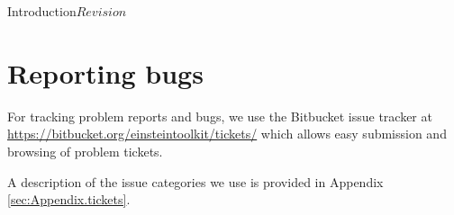 \begin{cactuspart}{Introduction}{}{$Revision$}

\chapter{Reporting bugs}
\label{sec:gehe}

For tracking problem reports and bugs, we use the Bitbucket issue tracker at
\url{https://bitbucket.org/einsteintoolkit/tickets/} which allows easy
submission and browsing of problem tickets.

A description of the issue categories we use is provided in Appendix
\ref{sec:Appendix.tickets}.




\end{cactuspart}
